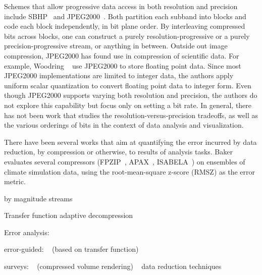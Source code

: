 Schemes that allow progressive data access in both resolution and precision include
SBHP~\cite{sbhp2000} and JPEG2000~\cite{jpeg2000}. Both partition each subband into blocks and code
each block independently, in bit plane order. By interleaving compressed bits across blocks, one can
construct a purely resolution-progressive or a purely precision-progressive stream, or anything in
between. Outside out image compression, JPEG2000 has found use in compression of scientific data.
For example, Woodring \etal~\cite{woodring2011} use JPEG2000 to store floating point data. Since
most JPEG2000 implementations are limited to integer data, the authors apply uniform scalar
quantization to convert floating point data to integer form. Even though JPEG2000 supports varying
both resolution and precision, the authors do not explore this capability but focus only on setting
a bit rate. In general, there has not been work that studies the resolution-versus-precision
tradeoffs, as well as the various orderings of bits in the context of data analysis and
visualization.

There have been several works that aim at quantifying the error incurred by data reduction, by
compression or otherwise, to results of analysis tasks. Baker
\etal~\cite{evauating-compression-climate} evaluates several compressors (FPZIP~\cite{fpzip},
APAX~\cite{apax}, ISABELA~\cite{isabela}) on ensembles of climate simulation data, using the
root-mean-square z-score (RMSZ) as the error metric. 

by magnitude streams~\cite{image_compression1992}

Transfer function adaptive decompression~\cite{tf_decompression2004}

Error analysis:
~\cite{compression_sim2013}
~\cite{statistical-volume-quality}
~\cite{evaluating-efficacy-wavelet}
~\cite{topology-verification-isosurface}
~\cite{verifiable-isosurface}
~\cite{verifying-volume-rendering}
~\cite{statistical-volume-quality}

error-guided: 
~\cite{tf_decompression2004} (based on transfer function)

surveys:
~\cite{state-of-the-art-compressed-volume} (compressed volume rendering)
~\cite{li2018} data reduction techniques
